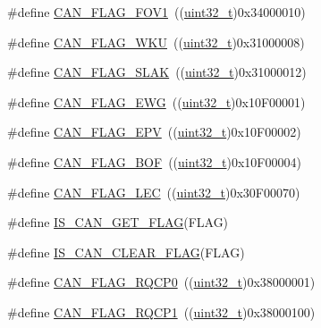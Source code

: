 \begin{DoxyCompactItemize}
\item 
\#define \hyperlink{group___c_a_n__flags_gac1af6e61b1285ddc4658c4bcc152719a}{C\+A\+N\+\_\+\+F\+L\+A\+G\+\_\+\+F\+O\+V1}~((\hyperlink{_p_e___types_8h_a33594304e786b158f3fb30289278f5af}{uint32\+\_\+t})0x34000010)
\item 
\#define \hyperlink{group___c_a_n__flags_ga18c72dbe75cb80e8b5126c23c9120818}{C\+A\+N\+\_\+\+F\+L\+A\+G\+\_\+\+W\+KU}~((\hyperlink{_p_e___types_8h_a33594304e786b158f3fb30289278f5af}{uint32\+\_\+t})0x31000008)
\item 
\#define \hyperlink{group___c_a_n__flags_gad087b5025a3d5ead2c32b06663821cf4}{C\+A\+N\+\_\+\+F\+L\+A\+G\+\_\+\+S\+L\+AK}~((\hyperlink{_p_e___types_8h_a33594304e786b158f3fb30289278f5af}{uint32\+\_\+t})0x31000012)
\item 
\#define \hyperlink{group___c_a_n__flags_gae8906ba9c4031866c5096418ffa9bf71}{C\+A\+N\+\_\+\+F\+L\+A\+G\+\_\+\+E\+WG}~((\hyperlink{_p_e___types_8h_a33594304e786b158f3fb30289278f5af}{uint32\+\_\+t})0x10\+F00001)
\item 
\#define \hyperlink{group___c_a_n__flags_ga61954e54995f638ed78281ad2b0cf43a}{C\+A\+N\+\_\+\+F\+L\+A\+G\+\_\+\+E\+PV}~((\hyperlink{_p_e___types_8h_a33594304e786b158f3fb30289278f5af}{uint32\+\_\+t})0x10\+F00002)
\item 
\#define \hyperlink{group___c_a_n__flags_ga65f20612d0bf1692003882c0cdbadb1c}{C\+A\+N\+\_\+\+F\+L\+A\+G\+\_\+\+B\+OF}~((\hyperlink{_p_e___types_8h_a33594304e786b158f3fb30289278f5af}{uint32\+\_\+t})0x10\+F00004)
\item 
\#define \hyperlink{group___c_a_n__flags_ga73a774fa4d391aec0ea6552bf9372917}{C\+A\+N\+\_\+\+F\+L\+A\+G\+\_\+\+L\+EC}~((\hyperlink{_p_e___types_8h_a33594304e786b158f3fb30289278f5af}{uint32\+\_\+t})0x30\+F00070)
\item 
\#define \hyperlink{group___c_a_n__flags_ga38d33d1762ed3a331d214cdb3249866e}{I\+S\+\_\+\+C\+A\+N\+\_\+\+G\+E\+T\+\_\+\+F\+L\+AG}(F\+L\+AG)
\item 
\#define \hyperlink{group___c_a_n__flags_gac46f5fb953efb6163cf3b2e33a514d0c}{I\+S\+\_\+\+C\+A\+N\+\_\+\+C\+L\+E\+A\+R\+\_\+\+F\+L\+AG}(F\+L\+AG)
\item 
\#define \hyperlink{group___c_a_n__flags_ga6df0579049eb471720ea103c5446298b}{C\+A\+N\+\_\+\+F\+L\+A\+G\+\_\+\+R\+Q\+C\+P0}~((\hyperlink{_p_e___types_8h_a33594304e786b158f3fb30289278f5af}{uint32\+\_\+t})0x38000001)
\item 
\#define \hyperlink{group___c_a_n__flags_gaba705586ebc3d961507436c03a2feaba}{C\+A\+N\+\_\+\+F\+L\+A\+G\+\_\+\+R\+Q\+C\+P1}~((\hyperlink{_p_e___types_8h_a33594304e786b158f3fb30289278f5af}{uint32\+\_\+t})0x38000100)

\end{DoxyCompactItemize}
